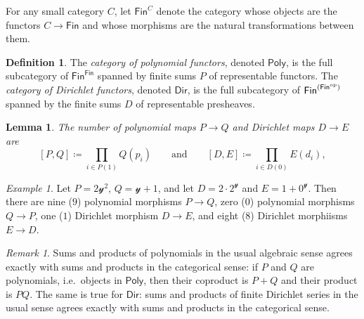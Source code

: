 \documentclass[11pt, article, one side]{memoir}
\theoremstyle{theorem}
\newtheorem{lemma}[equation]{Lemma}
\theoremstyle{definition}
\newtheorem{definition}[equation]{Definition}
\theoremstyle{remark}
\newtheorem{example}[equation]{Example}
\newtheorem{remark}[equation]{Remark}
\newcommand{\Cat}[1]{\mathsf{#1}}%
\newcommand{\op}{^\tn{op}}
\newcommand{\tn}[1]{\textnormal{#1}}
\newcommand{\finset}{\Cat{Fin}}
\newcommand{\yon}{\mathcal{y}}
\newcommand{\poly}{\Cat{Poly}}
\newcommand{\dir}{\Cat{Dir}}
\newcommand{\qqand}{\qquad\text{and}\qquad}
\begin{document}
For any small category $C$, let $\finset^C$ denote the category whose objects are the functors $C\to\finset$ and whose morphisms are the natural transformations between them.

\begin{definition}\label{def.poly_dir}
The \emph{category of polynomial functors}, denoted $\poly$, is the full subcategory of $\finset^\finset$ spanned by finite sums $P$ of representable functors. The \emph{category of Dirichlet functors}, denoted $\dir$, is the full subcategory of $\finset^{(\finset\op)}$ spanned by the finite sums $D$ of representable presheaves.
\end{definition}

\begin{lemma}
The number of polynomial maps $P\to Q$ and Dirichlet maps $D\to E$ are
\[
  [P, Q]\coloneqq\prod_{i\in P(1)}Q(p_i)
  \qqand
  [D, E]\coloneqq\prod_{i\in D(0)}E(d_i),
\]
\end{lemma}

\begin{example}
Let $P=2\yon^2$, $Q=\yon+1$, and let $D=2\cdot2^\yon$ and $E=1+0^\yon$. Then there are nine ($9$) polynomial morphisms $P\to Q$, zero ($0$) polynomial morphisms $Q\to P$, one ($1$) Dirichlet morphism $D\to E$, and eight ($8$) Dirichlet morphiisms $E\to D$.
\end{example}

\begin{remark}\label{rem.products_coproducts}
Sums and products of polynomials in the usual algebraic sense agrees exactly with sums and products in the categorical sense: if $P$ and $Q$ are polynomials, i.e.\ objects in $\poly$, then their coproduct is $P+Q$ and their product is $PQ$. The same is true for $\dir$: sums and products of finite Dirichlet series in the usual sense agrees exactly with sums and products in the categorical sense.
\end{remark}
\end{document}
